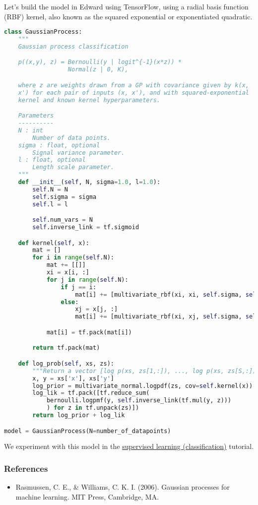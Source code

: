 Let's build the model in Edward using TensorFlow, using a radial basis function
(RBF) kernel, also known as the squared exponential or exponentiated quadratic.
\begin{lstlisting}[language=Python]
class GaussianProcess:
    """
    Gaussian process classification

    p((x,y), z) = Bernoulli(y | logit^{-1}(x*z)) *
                  Normal(z | 0, K),

    where z are weights drawn from a GP with covariance given by k(x,
    x') for each pair of inputs (x, x'), and with squared-exponential
    kernel and known kernel hyperparameters.

    Parameters
    ----------
    N : int
        Number of data points.
    sigma : float, optional
        Signal variance parameter.
    l : float, optional
        Length scale parameter.
    """
    def __init__(self, N, sigma=1.0, l=1.0):
        self.N = N
        self.sigma = sigma
        self.l = l

        self.num_vars = N
        self.inverse_link = tf.sigmoid

    def kernel(self, x):
        mat = []
        for i in range(self.N):
            mat += [[]]
            xi = x[i, :]
            for j in range(self.N):
                if j == i:
                    mat[i] += [multivariate_rbf(xi, xi, self.sigma, self.l)]
                else:
                    xj = x[j, :]
                    mat[i] += [multivariate_rbf(xi, xj, self.sigma, self.l)]

            mat[i] = tf.pack(mat[i])

        return tf.pack(mat)

    def log_prob(self, xs, zs):
        """Return a vector [log p(xs, zs[1,:]), ..., log p(xs, zs[S,:])]."""
        x, y = xs['x'], xs['y']
        log_prior = multivariate_normal.logpdf(zs, cov=self.kernel(x))
        log_lik = tf.pack([tf.reduce_sum(
            bernoulli.logpmf(y, self.inverse_link(tf.mul(y, z)))
            ) for z in tf.unpack(zs)])
        return log_prior + log_lik

model = GaussianProcess(N=number_of_datapoints)
\end{lstlisting}

We experiment with this model in the
\href{tut_supervised_classification}{supervised learning (classification)} tutorial.

\subsubsection{References}\label{references}

\begin{itemize}
\item
  Rasmussen, C. E., \& Williams, C. K. I. (2006). Gaussian processes
  for machine learning. MIT Press, Cambridge, MA.
\end{itemize}
